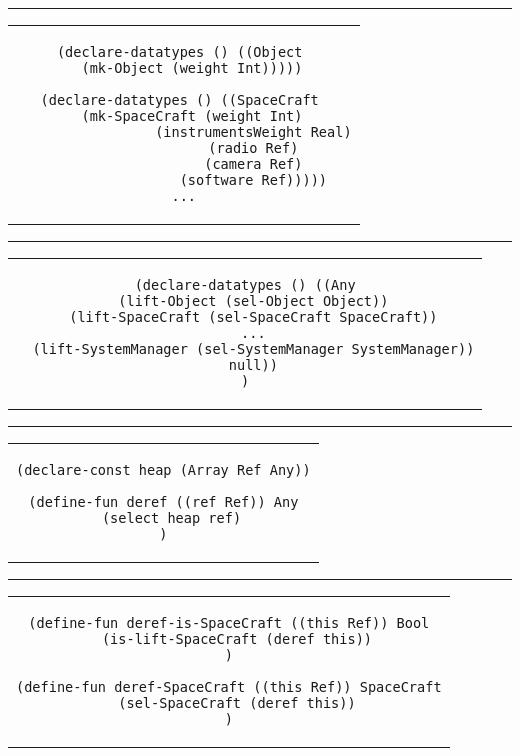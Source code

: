 \rule{\textwidth}{0.2pt}

\begin{center}
\begin{tabular}{c}
\begin{lstlisting}
(declare-datatypes () ((Object 
  (mk-Object (weight Int)))))
  
(declare-datatypes () ((SpaceCraft 
  (mk-SpaceCraft (weight Int)
                 (instrumentsWeight Real)
                 (radio Ref)
                 (camera Ref)
                 (software Ref)))))
...
\end{lstlisting}
\end{tabular}
\end{center}

\rule{\textwidth}{0.2pt}

\begin{center}
\begin{tabular}{c}
\begin{lstlisting}
(declare-datatypes () ((Any
  (lift-Object (sel-Object Object))
  (lift-SpaceCraft (sel-SpaceCraft SpaceCraft))
  ...
  (lift-SystemManager (sel-SystemManager SystemManager))
  null))
)
\end{lstlisting}
\end{tabular}
\end{center}

\rule{\textwidth}{0.2pt}

\begin{center}
\begin{tabular}{c}
\begin{lstlisting}
(declare-const heap (Array Ref Any))

(define-fun deref ((ref Ref)) Any
  (select heap ref)
)
\end{lstlisting}
\end{tabular}
\end{center}

\rule{\textwidth}{0.2pt}

\begin{center}
\begin{tabular}{c}
\begin{lstlisting}
(define-fun deref-is-SpaceCraft ((this Ref)) Bool
  (is-lift-SpaceCraft (deref this))
)

(define-fun deref-SpaceCraft ((this Ref)) SpaceCraft
  (sel-SpaceCraft (deref this))
)
\end{lstlisting}
\end{tabular}
\end{center}

